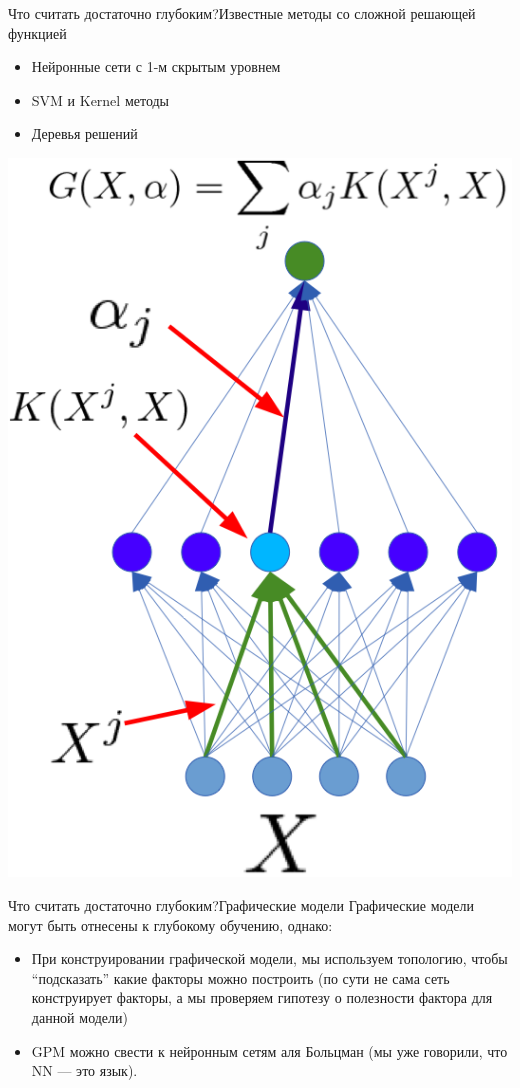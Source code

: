 \documentclass[14pt, fleqn, xcolor={dvipsnames, table}]{beamer}
\begin{document}
\begin{frame}{Что считать достаточно глубоким?}{Известные методы со сложной решающей функцией}
\begin{minipage}{0.45\textwidth}\small
\begin{itemize}
  \item Нейронные сети с 1-м скрытым уровнем
  \item SVM и Kernel методы
  \item Деревья решений
\end{itemize}
\end{minipage}
\hfill
\begin{minipage}{0.45\textwidth}
\includegraphics[width=\textwidth]{svmisnotdeep.png}
\end{minipage}
\end{frame}

\begin{frame}{Что считать достаточно глубоким?}{Графические модели}
\small
Графические модели могут быть отнесены к глубокому обучению, однако:
\begin{itemize}
  \item При конструировании графической модели, мы используем топологию, чтобы ``подсказать'' какие факторы можно построить (по сути не сама сеть конструирует факторы, а мы проверяем гипотезу о полезности фактора для данной модели)
  \item GPM можно свести к нейронным сетям аля Больцман (мы уже говорили, что NN --- это язык).
\end{itemize}
\end{frame}
\end{document}
